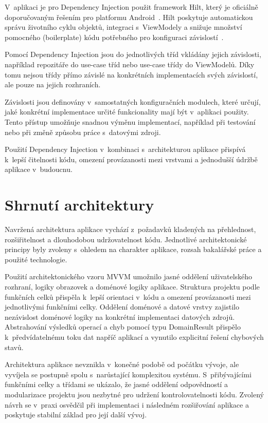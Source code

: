 V~aplikaci je pro Dependency Injection použit framework Hilt, který je oficiálně doporučovaným řešením pro platformu Android~\parencite{android_recommend_hilt}.
Hilt poskytuje automatickou správu životního cyklu objektů, integraci s~ViewModely a snižuje množství pomocného (boilerplate) kódu potřebného pro konfiguraci závislostí~\parencite{android_hilt_overview}.

Pomocí Dependency Injection jsou do jednotlivých tříd vkládány jejich závislosti, například repozitáře do use-case tříd nebo use-case třídy do ViewModelů.
Díky tomu nejsou třídy přímo závislé na konkrétních implementacích svých závislostí, ale pouze na jejich rozhraních.

Závislosti jsou definovány v~samostatných konfiguračních modulech, které určují, jaké konkrétní implementace určité funkcionality mají být v~aplikaci použity.
Tento přístup umožňuje snadnou výměnu implementací, například při testování nebo při změně způsobu práce s~datovými zdroji.

Použití Dependency Injection v~kombinaci s~architekturou aplikace přispívá k~lepší čitelnosti kódu, omezení provázanosti mezi vrstvami a jednodušší údržbě aplikace v~budoucnu.


\section{Shrnutí architektury}
Navržená architektura aplikace vychází z~požadavků kladených na přehlednost, rozšiřitelnost a dlouhodobou udržovatelnost kódu.
Jednotlivé architektonické principy byly zvoleny s~ohledem na charakter aplikace, rozsah bakalářské práce a použité technologie.

Použití architektonického vzoru MVVM umožnilo jasné oddělení uživatelského rozhraní, logiky obrazovek a doménové logiky aplikace.
Struktura projektu podle funkčních celků přispěla k~lepší orientaci v~kódu a omezení provázanosti mezi jednotlivými funkčními celky.
Oddělení doménové a datové vrstvy zajistilo nezávislost doménové logiky na konkrétní implementaci datových zdrojů.
Abstrahování výsledků operací a chyb pomocí typu DomainResult přispělo k~předvídatelnému toku dat napříč aplikací a vynutilo explicitní řešení chybových stavů.

Architektura aplikace nevznikla v~konečné podobě od počátku vývoje, ale vyvíjela se postupně spolu s~narůstající komplexitou systému.
S~přibývajícími funkčními celky a třídami se ukázalo, že jasné oddělení odpovědností a modularizace projektu jsou nezbytné pro udržení kontrolovatelnosti kódu.
Zvolený návrh se v~praxi osvědčil při implementaci i následném rozšiřování aplikace a poskytuje stabilní základ pro její další vývoj.